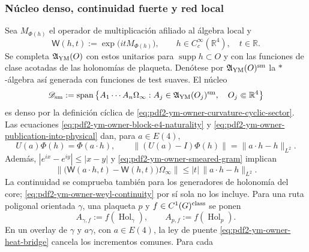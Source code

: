 \subsubsection{Núcleo denso, continuidad fuerte y red local}

Sea $M_{\Phi(h)}$ el operador de multiplicación afiliado al álgebra local y
\begin{equation}\label{eq:pdf2-ym-owner-curvature-weyl}
 \mathsf W(h,t):=\exp\!\bigl(itM_{\Phi(h)}\bigr),
 \qquad h\in C_c^\infty(\mathbb R^4),\quad t\in\mathbb R.
\end{equation}
Se completa $\mathfrak A_{\rm YM}(O)$ con estos unitarios para
$\operatorname{supp}h\subset O$ y con las funciones de clase acotadas de las
holonomías de plaqueta. Denótese por $\mathfrak A_{\rm YM}(O)^{\rm sm}$ la
$*$-álgebra así generada con funciones de test suaves. El núcleo
\begin{equation}\label{eq:pdf2-ym-owner-smooth-core}
 \mathscr D_{\rm sm}:=\operatorname{span}\left\{
 A_1\cdots A_n\Omega_\infty:
 A_j\in\mathfrak A_{\rm YM}(O_j)^{\rm sm},\quad
 O_j\Subset\mathbb R^4\right\}
\end{equation}
es denso por la definición cíclica de
\eqref{eq:pdf2-ym-owner-curvature-cyclic-sector}. Las ecuaciones
\eqref{eq:pdf2-ym-owner-block-e4-naturality} y
\eqref{eq:pdf2-ym-owner-publication-into-physical} dan, para $a\in E(4)$,
\begin{equation}\label{eq:pdf2-ym-owner-field-e4-covariance}
 U(a)\Phi(h)=\Phi(a\!\cdot h),
 \qquad
 \|(U(a)-I)\Phi(h)\|=\|a\!\cdot h-h\|_{L^2}.
\end{equation}
Además, $|e^{ix}-e^{iy}|\le|x-y|$ y
\eqref{eq:pdf2-ym-owner-smeared-gram} implican
\begin{equation}\label{eq:pdf2-ym-owner-weyl-continuity}
 \|\bigl(\mathsf W(a\!\cdot h,t)-\mathsf W(h,t)\bigr)\Omega_\infty\|
 \le |t|\,\|a\!\cdot h-h\|_{L^2}.
\end{equation}
La continuidad se comprueba también para los generadores de holonomía del core;
\eqref{eq:pdf2-ym-owner-weyl-continuity} por sí sola no los incluye. Para una ruta poligonal orientada $\gamma$,
una plaqueta $p$ y $f\in C^1(G)^{\rm class}$ se ponen
\begin{equation}\label{eq:pdf2-ym-owner-holonomy-core-generators}
 A_{\gamma,f}:=f(\operatorname{Hol}_\gamma),
 \qquad A_{p,f}:=f(\operatorname{Hol}_p).
\end{equation}
En un overlay de $\gamma$ y $a\gamma$, con $a\in E(4)$, la ley de puente
\eqref{eq:pdf2-ym-owner-heat-bridge} cancela los incrementos comunes. Para cada

